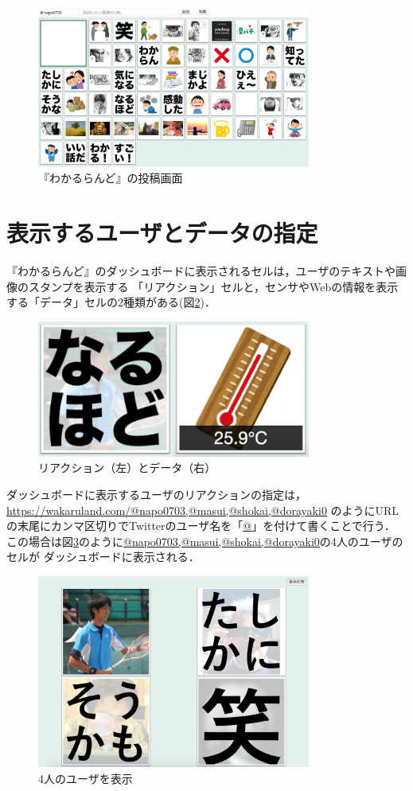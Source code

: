 \begin{figure}[h]
\centering
\includegraphics[width=9cm]{images/console.png}
\caption{『わかるらんど』の投稿画面}
\label{console}
\end{figure}

\section{表示するユーザとデータの指定}

『わかるらんど』のダッシュボードに表示されるセルは，ユーザのテキストや画像のスタンプを表示する
「リアクション」セルと，センサやWebの情報を表示する「データ」セルの2種類がある(図\ref{cell})．

\begin{figure}[h]
\centering
\includegraphics[width=9cm]{images/cell.png}
\caption{リアクション（左）とデータ（右）}
\label{cell}
\end{figure}

ダッシュボードに表示するユーザのリアクションの指定は，
\url{https://wakaruland.com/@napo0703,@masui,@shokai,@dorayaki0}
のようにURLの末尾にカンマ区切りでTwitterのユーザ名を「\url{@}」を付けて書くことで行う．
この場合は図\ref{n_m_s_d}のように\url{@napo0703,@masui,@shokai,@dorayaki0}の4人のユーザのセルが
ダッシュボードに表示される．

\begin{figure}[h]
\centering
\includegraphics[width=9cm]{images/n_m_s_d.png}
\caption{4人のユーザを表示}
\label{n_m_s_d}
\end{figure}

